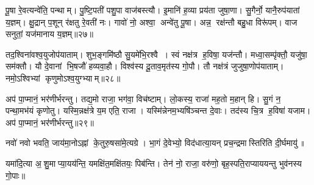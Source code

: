 पू॒षा रे॒वत्यन्वे॑ति॒ पन्थाम्। 
पु॒ष्टि॒पती॑ पशु॒पा वाज॑बस्त्यौ। 
इ॒मानि॑ ह॒व्या प्रय॑ता जुषा॒णा। 
सु॒गैर्नो॒ यानै॒रुप॑यातां य॒ज्ञम्। 
क्षु॒द्रान् प॒शून् र॑क्षतु रे॒वती॑ नः। 
गावो॑ नो॒ अश्वा॒ अन्वे॑तु पू॒षा। 
अन्न॒ रक्ष॑न्तौ बहु॒धा विरू॑पम्। 
वाज सनुतां॒ यज॑मानाय य॒ज्ञम्॥२७॥ 

तद॒श्विना॑वश्व॒युजोप॑याताम्। 
शुभ॒ङ्गमि॑ष्ठौ सु॒यमे॑भि॒रश्वै। 
स्वं नक्ष॑त्र ह॒विषा॒ यज॑न्तौ। 
मध्वा॒सम्पृ॑क्तौ॒ यजु॑षा॒ सम॑क्तौ। 
यौ दे॒वानां भि॒षजौ॑ हव्यवा॒हौ। 
विश्व॑स्य दू॒ताव॒मृत॑स्य गो॒पौ। 
तौ नक्ष॑त्रं जुजुषा॒णोप॑याताम्। 
नमो॒ऽश्विभ्यां कृणुमोऽश्व॒युग्भ्याम्॥२८॥ 

अप॑ पा॒प्मानं॒ भर॑णीर्भरन्तु। 
तद्य॒मो राजा॒ भग॑वा॒\an{} विच॑ष्टाम्। 
लो॒कस्य॒ राजा॑ मह॒तो म॒हान् हि। 
सु॒गं न॒ पन्था॒मभ॑यं कृणोतु। 
यस्मि॒न्नक्ष॑त्रे य॒म एति॒ राजा। 
यस्मि॑न्नेनम॒भ्यषि॑ञ्चन्त दे॒वाः। 
तद॑स्य चि॒त्र ह॒विषा॑ यजाम। 
अप॑ पा॒प्मानं॒ भर॑णीर्भरन्तु॥२९॥ 


नवो॑ नवो भवति॒ जाय॑मा॒नोऽह्नां के॒तुरु॒षसा॑मे॒त्यग्रे।
भा॒गं दे॒वेभ्यो॒ विद॑धात्या॒यन् प्रच॒न्द्रमास्तिरिति दी॒र्घमायु॑॥

यमा॑दि॒त्या अ॒शु॒माप्या॒यय॑न्ति॒ यमक्षि॑त॒मक्षि॑तयः॒ पिब॑न्ति।
तेन॑ नो॒ राजा॒ वरु॑णो॒ बृह॒स्पति॒राप्याययन्तु भुव॑नस्य गो॒पाः॥

